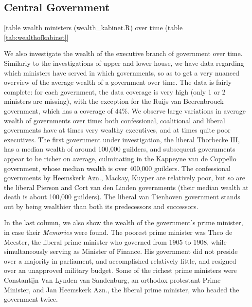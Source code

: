 \subsection{Central Government}
\begin{center}
    [table wealth ministers (wealth\_kabinet.R) over time (table \ref{tab:wealthofkabinet}]
 \end{center}   
    We also investigate the wealth of the executive branch of government over time. Similarly to the investigations of upper and lower house, we have data regarding which ministers have served in which governments, so as to get a very nuanced overview of the average wealth of a government over time. The data is fairly complete: for each government, the data coverage is very high (only 1 or 2 ministers are missing), with the exception for the Ruijs van Beerenbrouck government, which has a coverage of 44\%. We observe large variations in average wealth of governments over time: both confessional, coalitional and liberal governments have at times very wealthy executives, and at times quite poor executives. The first government under investigation, the liberal Thorbecke III, has a median wealth of around 100,000 guilders, and subsequent governments appear to be richer on average, culminating in the Kappeyne van de Coppello government, whose median wealth is over 400,000 guilders. The confessional governments by Heemskerk Azn., Mackay, Kuyper are relatively poor, but so are the liberal Pierson and Cort van den Linden governments (their median wealth at death is about 100,000 guilders). The liberal van Tienhoven government stands out by being wealthier than both its predecessors and successors. 
    
    In the last column, we also show the wealth of the government's prime minister, in case their \textit{Memories} were found. The poorest prime minister was Theo de Meester, the liberal prime minister  who governed from 1905 to 1908, while simultaneously serving as Minister of Finance. His government did not preside over a majority in parliament, and accomplished relatively little, and resigned over an unapproved military budget. Some of the richest prime ministers were Constantijn Van Lynden van Sandenburg, an orthodox protestant Prime Minister, and Jan Heemskerk Azn., the liberal prime minister, who headed the government twice. 
    
